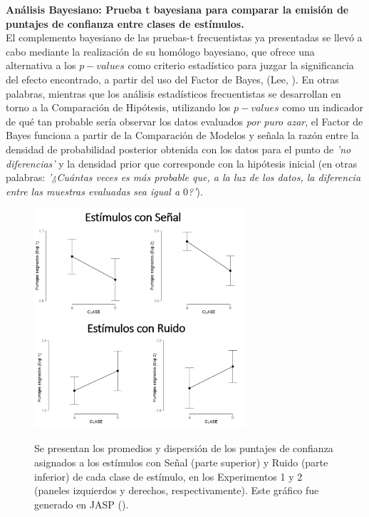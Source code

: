 \textbf{Análisis Bayesiano: Prueba t bayesiana para comparar la emisión de puntajes de confianza entre clases de estímulos.}\\

El complemento bayesiano de las pruebas-t frecuentistas ya presentadas se llevó a cabo mediante la realización de su homólogo bayesiano, que ofrece una alternativa a los $p-values$ como criterio estadístico para juzgar la significancia del efecto encontrado, a partir del uso del Factor de Bayes, (Lee, \citeyear{Lee2016}). En otras palabras, mientras que los análisis estadísticos frecuentistas se desarrollan en torno a la Comparación de Hipótesis, utilizando los $p-values$ como un indicador de qué tan probable sería observar los datos evaluados \textit{por puro azar}, el Factor de Bayes funciona a partir de la Comparación de Modelos y señala la razón entre la densidad de probabilidad posterior obtenida con los datos para el punto de \textit{'no diferencias'} y la densidad prior que corresponde con la hipótesis inicial (en otras palabras: \textit{'¿Cuántas veces es más probable que, a la luz de los datos, la diferencia entre las muestras evaluadas sea igual a $0$?'}).\\

\begin{figure}[h]
\centering
\includegraphics[width=0.7\textwidth]{Figures/JASP_MeanRatings}\\ 
\decoRule
\caption[Gráfico de dispersión para los puntajes de confianza asignados a cada clase de estímulo]{Se presentan los promedios y dispersión de los puntajes de confianza asignados a los estímulos con Señal (parte superior) y Ruido (parte inferior) de cada clase de estímulo, en los Experimentos 1 y 2 (paneles izquierdos y derechos, respectivamente). Este gráfico fue generado en JASP (\citeyear{JASP}).}
\label{fig:JASP_MeanRatings}
\end{figure}

